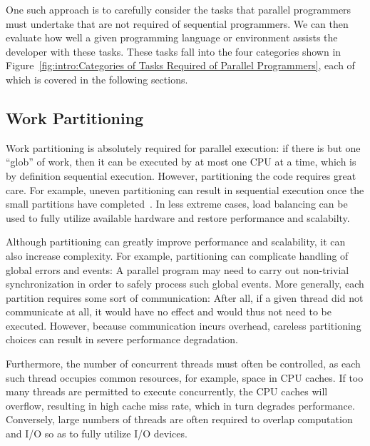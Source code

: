 One such approach is to carefully consider the tasks that parallel
programmers must undertake that are not required of sequential programmers.
We can then evaluate how well a given programming language or environment
assists the developer with these tasks.
These tasks fall into the four categories shown in
Figure~\ref{fig:intro:Categories of Tasks Required of Parallel Programmers},
each of which is covered in the following sections.

\subsection{Work Partitioning}
\label{sec:intro:Work Partitioning}

Work partitioning is absolutely required for parallel execution:
if there is but one ``glob'' of work, then it can be executed by at
most one CPU at a time, which is by definition sequential execution.
However, partitioning the code requires great care.
For example, uneven partitioning can result in sequential execution
once the small partitions have completed~\cite{GeneAmdahl1967AmdahlsLaw}.
In less extreme cases, load balancing can be used to fully utilize
available hardware and restore performance and scalabilty.

Although partitioning can greatly improve performance and scalability,
it can also increase complexity.
For example, partitioning can complicate handling of global
errors and events: A parallel
program may need to carry out non-trivial synchronization in order
to safely process such global events.
More generally, each partition requires some sort of communication:
After all, if
a given thread did not communicate at all, it would have no effect and
would thus not need to be executed.
However, because communication incurs overhead, careless partitioning choices
can result in severe performance degradation.

Furthermore, the number of concurrent threads must often be controlled,
as each such thread occupies common resources, for example,
space in CPU caches.
If too many threads are permitted to execute concurrently, the
CPU caches will overflow, resulting in high cache miss rate, which in
turn degrades performance.
Conversely, large numbers of threads are often required to
overlap computation and I/O so as to fully utilize I/O devices.

